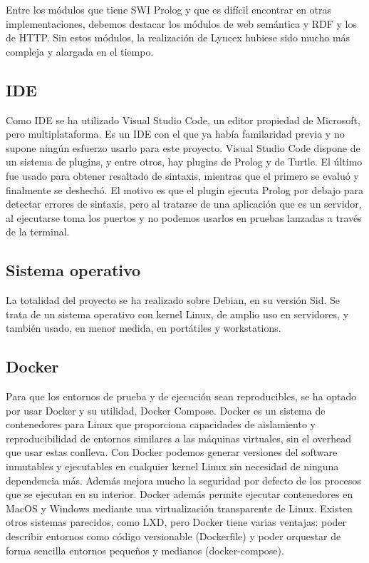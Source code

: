 \documentclass[12pt]{report} %
\begin{document}
Entre los módulos que tiene SWI Prolog y que es difícil encontrar en otras implementaciones, debemos destacar los módulos de web semántica y RDF y los de HTTP.
Sin estos módulos, la realización de Lyncex hubiese sido mucho más compleja y alargada en el tiempo.

\subsection{IDE}
Como IDE se ha utilizado Visual Studio Code\cite{vscode}, un editor propiedad de Microsoft, pero multiplataforma.
Es un IDE con el que ya había familaridad previa y no supone ningún esfuerzo usarlo para este proyecto.
Visual Studio Code dispone de un sistema de plugins, y entre otros, hay plugins de Prolog y de Turtle.
El último fue usado para obtener resaltado de sintaxis, mientras que el primero se evaluó y finalmente se deshechó.
El motivo es que el plugin ejecuta Prolog por debajo para detectar errores de sintaxis, pero al tratarse de una aplicación que es un servidor, al ejecutarse toma los puertos y no podemos usarlos
en pruebas lanzadas a través de la terminal.

\subsection{Sistema operativo}
La totalidad del proyecto se ha realizado sobre Debian, en su versión Sid. Se trata de un sistema operativo con kernel Linux, de amplio uso en servidores, y también usado, en menor medida, en portátiles y workstations.

\subsection{Docker}
Para que los entornos de prueba y de ejecución sean reproducibles, se ha optado por usar Docker y su utilidad, Docker Compose.
Docker es un sistema de contenedores para Linux que proporciona capacidades de aislamiento y reproducibilidad de entornos similares a las máquinas virtuales, sin el overhead que usar estas conlleva. Con Docker podemos generar versiones del software inmutables y ejecutables en cualquier kernel Linux sin necesidad de ninguna dependencia más.
Además mejora mucho la seguridad por defecto de los procesos que se ejecutan en su interior.
Docker además permite ejecutar contenedores en MacOS y Windows mediante una virtualización transparente de Linux.
Existen otros sistemas parecidos, como LXD, pero Docker tiene varias ventajas: poder describir entornos como código versionable (Dockerfile) y poder orquestar de forma sencilla entornos pequeños y medianos (docker-compose).
\end{document}
